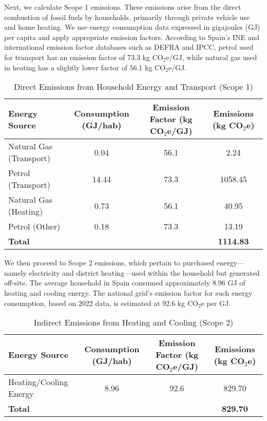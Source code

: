 \documentclass[12pt,a4paper]{article}
\begin{document}
Next, we calculate Scope 1 emissions. These emissions arise from the direct combustion of fossil fuels by households, primarily through private vehicle use and home heating. We use energy consumption data expressed in gigajoules (GJ) per capita and apply appropriate emission factors. According to Spain’s INE and international emission factor databases such as DEFRA and IPCC, petrol used for transport has an emission factor of 73.3 kg CO$_2$e/GJ, while natural gas used in heating has a slightly lower factor of 56.1 kg CO$_2$e/GJ.

\begin{table}[h]
\centering
\caption{Direct Emissions from Household Energy and Transport (Scope 1)}
\label{tab:scope1}
\begin{tabular}{|l|c|c|c|}
\hline
\textbf{Energy Source} & \textbf{Consumption (GJ/hab)} & \textbf{Emission Factor (kg CO$_2$e/GJ)} & \textbf{Emissions (kg CO$_2$e)} \\
\hline
Natural Gas (Transport) & 0.04 & 56.1 & 2.24 \\
Petrol (Transport) & 14.44 & 73.3 & 1058.45 \\
Natural Gas (Heating) & 0.73 & 56.1 & 40.95 \\
Petrol (Other) & 0.18 & 73.3 & 13.19 \\
\hline
\textbf{Total} & & & \textbf{1114.83} \\
\hline
\end{tabular}
\end{table}

We then proceed to Scope 2 emissions, which pertain to purchased energy—namely electricity and district heating—used within the household but generated off-site. The average household in Spain consumed approximately 8.96 GJ of heating and cooling energy. The national grid's emission factor for such energy consumption, based on 2022 data, is estimated at 92.6 kg CO$_2$e per GJ.

\begin{table}[h]
\centering
\caption{Indirect Emissions from Heating and Cooling (Scope 2)}
\label{tab:scope2}
\begin{tabular}{|l|c|c|c|}
\hline
\textbf{Energy Source} & \textbf{Consumption (GJ/hab)} & \textbf{Emission Factor (kg CO$_2$e/GJ)} & \textbf{Emissions (kg CO$_2$e)} \\
\hline
Heating/Cooling Energy & 8.96 & 92.6 & 829.70 \\
\hline
\textbf{Total} & & & \textbf{829.70} \\
\hline
\end{tabular}
\end{table}
\end{document}
